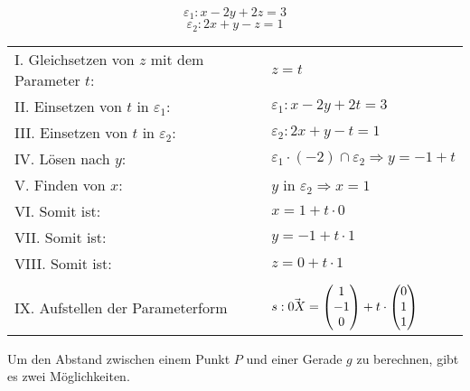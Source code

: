 \begin{itemize}
  $$\varepsilon_{1}: x - 2y + 2z = 3$$ $$\varepsilon_{2}: 2x + y - z = 1$$

  \begin{table}[h!]
    \begin{tabular}{l l}
    I. Gleichsetzen von $z$ mit dem Parameter $t$: & $z = t$
    \\
    II. Einsetzen von $t$ in $\varepsilon_{1}$: & $\varepsilon_{1}: x - 2y + 2t = 3$
    \\
    III. Einsetzen von $t$ in $\varepsilon_{2}$: & $\varepsilon_{2}: 2x + y - t = 1$
    \\
    IV. L\"{o}sen nach $y$: & $\varepsilon_{1} \cdot (-2) \cap \varepsilon_{2} \Rightarrow y = -1 + t$
    \\
    V. Finden von $x$: & $y$ in $\varepsilon_{2} \Rightarrow x = 1$
    \\
    VI. Somit ist: & $x = 1 + t \cdot 0$
    \\
    VII. Somit ist: & $y = -1 + t \cdot 1$
    \\
    VIII. Somit ist: & $z = 0 + t \cdot 1$
    \\ & \\
    IX. Aufstellen der Parameterform & $s: \vec{0X} = \begin{pmatrix}1 \\ -1 \\ 0\end{pmatrix} + t \cdot \begin{pmatrix}0 \\ 1 \\ 1\end{pmatrix}$
    \end{tabular}
  \end{table}

\end{itemize}

\pagebreak


Um den Abstand zwischen einem Punkt $P$ und einer Gerade $g$ zu berechnen, gibt es zwei M\"{o}glichkeiten.

